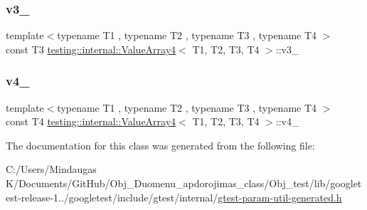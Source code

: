 \subsubsection{\texorpdfstring{v3\_}{v3\_}}
{\footnotesize\ttfamily template$<$typename T1 , typename T2 , typename T3 , typename T4 $>$ \\
const T3 \mbox{\hyperlink{classtesting_1_1internal_1_1_value_array4}{testing\+::internal\+::\+Value\+Array4}}$<$ T1, T2, T3, T4 $>$\+::v3\+\_\+\hspace{0.3cm}{\ttfamily [private]}}

\mbox{\label{classtesting_1_1internal_1_1_value_array4_af22a84df122c40d8f2ec6a82acdd7d14}} 
\subsubsection{\texorpdfstring{v4\_}{v4\_}}
{\footnotesize\ttfamily template$<$typename T1 , typename T2 , typename T3 , typename T4 $>$ \\
const T4 \mbox{\hyperlink{classtesting_1_1internal_1_1_value_array4}{testing\+::internal\+::\+Value\+Array4}}$<$ T1, T2, T3, T4 $>$\+::v4\+\_\+\hspace{0.3cm}{\ttfamily [private]}}



The documentation for this class was generated from the following file\+:\begin{DoxyCompactItemize}
\item 
C\+:/\+Users/\+Mindaugas K/\+Documents/\+Git\+Hub/\+Obj\+\_\+\+Duomenu\+\_\+apdorojimas\+\_\+class/\+Obj\+\_\+test/lib/googletest-\/release-\/1../googletest/include/gtest/internal/\mbox{\hyperlink{gtest-param-util-generated_8h}{gtest-\/param-\/util-\/generated.\+h}}\end{DoxyCompactItemize}
